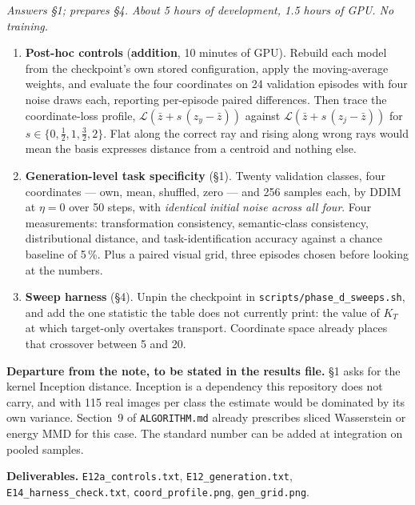 \documentclass[11pt]{article}
\newcommand{\code}[1]{\texttt{\small #1}}
\newcommand{\KT}{K_{T}}
\newcommand{\add}{\textcolor{addition}{\textbf{addition}}}
\begin{document}
\noindent\emph{Answers \S1; prepares \S4. About 5 hours of development, 1.5 hours of GPU.
No training.}

\begin{enumerate}
  \item \textbf{Post-hoc controls} (\add, 10 minutes of GPU). Rebuild each model from the
    checkpoint's own stored configuration, apply the moving-average weights, and evaluate
    the four coordinates on 24 validation episodes with four noise draws each, reporting
    per-episode paired differences. Then trace the coordinate-loss profile,
    $\mathcal{L}(\bar z + s\,(z_y - \bar z))$ against
    $\mathcal{L}(\bar z + s\,(z_j - \bar z))$ for $s \in \{0,\tfrac12,1,\tfrac32,2\}$.
    Flat along the correct ray and rising along wrong rays would mean the basis expresses
    distance from a centroid and nothing else.
  \item \textbf{Generation-level task specificity} (\S1). Twenty validation classes, four
    coordinates --- own, mean, shuffled, zero --- and 256 samples each, by DDIM at
    $\eta = 0$ over 50 steps, with \emph{identical initial noise across all four}. Four
    measurements: transformation consistency, semantic-class consistency, distributional
    distance, and task-identification accuracy against a chance baseline of 5\,\%. Plus a
    paired visual grid, three episodes chosen before looking at the numbers.
  \item \textbf{Sweep harness} (\S4). Unpin the checkpoint in
    \code{scripts/phase\_d\_sweeps.sh}, and add the one statistic the table does not
    currently print: the value of $\KT$ at which target-only overtakes transport.
    Coordinate space already places that crossover between 5 and 20.
\end{enumerate}

\noindent\textbf{Departure from the note, to be stated in the results file.} \S1 asks for
the kernel Inception distance. Inception is a dependency this repository does not carry,
and with 115 real images per class the estimate would be dominated by its own variance.
Section~9 of \code{ALGORITHM.md} already prescribes sliced Wasserstein or energy MMD for
this case. The standard number can be added at integration on pooled samples.

\noindent\textbf{Deliverables.} \code{E12a\_controls.txt}, \code{E12\_generation.txt},
\code{E14\_harness\_check.txt}, \code{coord\_profile.png}, \code{gen\_grid.png}.

\end{document}
